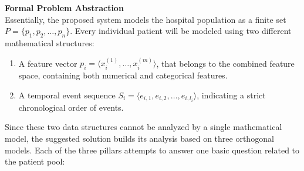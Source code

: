 \textbf{Formal Problem Abstraction} \\
Essentially, the proposed system models the hospital population as a finite set $P = \{p_1, p_2, \dots, p_n\}$. Every individual patient will be modeled using two different mathematical structures:
\begin{enumerate}
    \item A feature vector $p_i = \langle x_i^{(1)}, \dots, x_i^{(m)} \rangle$, that belongs to the combined feature space, containing both numerical and categorical features.
    \item A temporal event sequence $S_i = \langle e_{i,1}, e_{i,2}, \dots, e_{i,l_i} \rangle$, indicating a strict chronological order of events.
\end{enumerate}

\vspace{1em}

Since these two data structures cannot be analyzed by a single mathematical model, the suggested solution builds its analysis based on three orthogonal models. Each of the three pillars attempts to answer one basic question related to the patient pool:

\vspace{1em}

